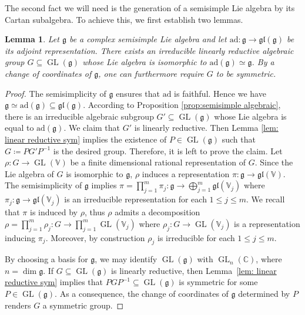 \documentclass[11pt,reqno]{amsart}
\DeclareMathOperator{\GL}{GL}
\newtheorem{lemma}[theorem]{Lemma}
\newcommand{\ad}{\mathrm{ad}}
\begin{document}
The second fact we will need is the generation of a semisimple Lie algebra by its Cartan subalgebra.  To achieve this,  we first establish two lemmas.
\begin{lemma}\label{cor: semisimple is symmetric}
Let $\mathfrak{g}$ be a complex semisimple Lie algebra and let $\ad: \mathfrak{g} \to \mathfrak{gl}(\mathfrak{g})$ be its adjoint representation.  There exists an irreducible linearly reductive algebraic group $G \subseteq \GL(\mathfrak{g}) $ whose Lie algebra is isomorphic to $\ad(\mathfrak{g}) \simeq \mathfrak{g}$. By a change of coordinates of $\mathfrak{g}$, one can furthermore require $G$ to be symmetric.  
\end{lemma}
\begin{proof}
The semisimplicity of $\mathfrak{g}$ ensures that $\ad$ is faithful.  Hence we have $\mathfrak{g} \simeq \ad(\mathfrak{g}) \subseteq \mathfrak{gl}(\mathfrak{g})$. According to Proposition \ref{prop:semisimple algebraic},  there is an irreducible algebraic subgroup $G' \subseteq \GL(\mathfrak{g})$ whose Lie algebra is equal to $\ad(\mathfrak{g})$.  We claim that $G'$ is linearly reductive.  Then Lemma \ref{lem: linear reductive sym} implies the existence of $P \in \GL(\mathfrak{g})$ such that $G \coloneqq P G' P^{-1} $ is the desired group.  Therefore,  it is left to prove the claim.  Let $\rho: G \to \GL(\mathbb{V})$ be a finite dimensional rational representation of $G$.  Since the Lie algebra of $G$ is isomorphic to $\mathfrak{g}$,  $\rho$ induces a representation $\pi: \mathfrak{g}  \to \mathfrak{gl}(\mathbb{V})$.  The semisimplicity of $\mathfrak{g}$ implies $\pi = \prod_{j=1}^m \pi_j: \mathfrak{g} \to \bigoplus_{j=1}^m \mathfrak{gl}(\mathbb{V}_j)$ where $\pi_j:  \mathfrak{g} \to \mathfrak{gl}(\mathbb{V}_j)$ is an irreducible representation for each $1 \le j \le m$.  We recall that $\pi$ is induced by $\rho$,  thus $\rho$ admits a decomposition $\rho = \prod_{j=1}^m \rho_j:  G \to \prod_{j=1}^m \GL(\mathbb{V}_j)$ where $\rho_j: G \to \GL(\mathbb{V}_j)$ is a representation inducing $\pi_j$.  Moreover,  by construction $\rho_j$ is irreducible for each $1 \le j \le m$.

By choosing a basis for $\mathfrak{g}$,  we may identify $\GL(\mathfrak{g})$ with $\GL_n(\mathbb{C})$,  where $n = \dim \mathfrak{g}$.  If $G \subseteq \GL(\mathfrak{g})$ is linearly reductive,  then Lemma~\ref{lem: linear reductive sym} implies that $P G P^{-1} \subseteq  \GL(\mathfrak{g})$ is symmetric for some $P\in  \GL(\mathfrak{g})$.  As a consequence,  the change of coordinates of $\mathfrak{g}$ determined by $P$ renders $G$ a symmetric group.
\end{proof}
\end{document}
